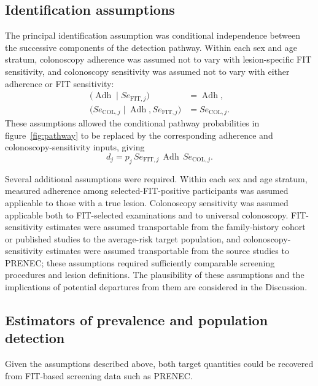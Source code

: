 \documentclass[10pt,a4paper]{article}
\newcommand{\Se}{\mathit{Se}}
\newcommand{\Adh}{\operatorname{Adh}}
\begin{document}
\subsection*{Identification assumptions}
The principal identification assumption was conditional independence between the successive components of the detection pathway. Within each sex and age stratum, colonoscopy adherence was assumed not to vary with lesion-specific FIT sensitivity, and colonoscopy sensitivity was assumed not to vary with either adherence or FIT sensitivity:
\begin{align*}
\bigl(\Adh\mid\Se_{\mathrm{FIT},j}\bigr)&=\Adh,\\
\bigl(\Se_{\mathrm{COL},j}\mid\Adh,\Se_{\mathrm{FIT},j}\bigr)&=\Se_{\mathrm{COL},j}.
\end{align*}
These assumptions allowed the conditional pathway probabilities in figure~\ref{fig:pathway} to be replaced by the corresponding adherence and colonoscopy-sensitivity inputs, giving
\begin{equation*}
d_j=p_j\,\Se_{\mathrm{FIT},j}\,\Adh\,\Se_{\mathrm{COL},j}.
\end{equation*}


Several additional assumptions were required. Within each sex and age stratum, measured adherence among selected-FIT-positive participants was assumed applicable to those with a true lesion. Colonoscopy sensitivity was assumed applicable both to FIT-selected examinations and to universal colonoscopy. FIT-sensitivity estimates were assumed transportable from the family-history cohort or published studies to the average-risk target population, and colonoscopy-sensitivity estimates were assumed transportable from the source studies to PRENEC; these assumptions required sufficiently comparable screening procedures and lesion definitions. The plausibility of these assumptions and the implications of potential departures from them are considered in the Discussion.


\subsection*{Estimators of prevalence and population detection}
Given the assumptions described above, both target quantities could be recovered from FIT-based screening data such as PRENEC.
\end{document}

